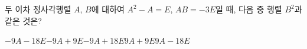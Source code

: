두 이차 정사각행렬 $A$, $B$에 대하여 $A^2-A=E$, $AB=-3E$일 때, 다음 중 행렬 $B^2$과 같은 것은?
\begin{choicesii}{$-9A-18E$}{$-9A+9E$}{$-9A+18E$}{$9A+9E$}{$9A-18E$}\end{choicesii}
